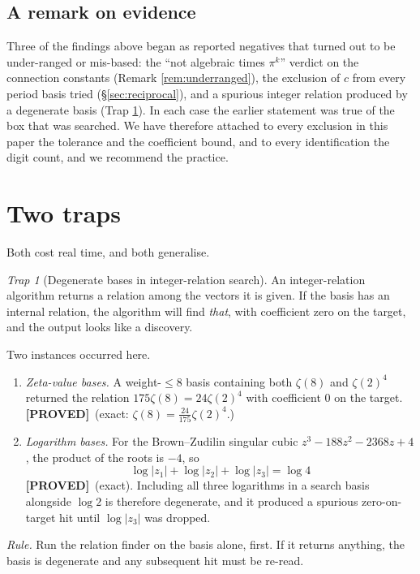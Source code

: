 \documentclass[11pt,reqno]{amsart}
\theoremstyle{plain}
\theoremstyle{definition}
\theoremstyle{remark}
\newtheorem{trap}[theorem]{Trap}
\newcommand{\PROVED}{{\normalfont\sffamily\bfseries[PROVED]}}
\begin{document}
\subsection{A remark on evidence}
Three of the findings above began as reported negatives that turned out to be under-ranged or
mis-based: the ``not algebraic times $\pi^k$'' verdict on the connection constants (Remark
\ref{rem:underranged}), the exclusion of $c$ from every period basis tried (\S\ref{sec:reciprocal}),
and a spurious integer relation produced by a degenerate basis (Trap \ref{trap:basis}). In each
case the earlier statement was true of the box that was searched. We have therefore attached to
every exclusion in this paper the tolerance and the coefficient bound, and to every identification
the digit count, and we recommend the practice.

\appendix

\section{Two traps}\label{app:traps}

Both cost real time, and both generalise.

\begin{trap}[Degenerate bases in integer-relation search]\label{trap:basis}
An integer-relation algorithm returns a relation among the vectors it is given. If the basis has
an internal relation, the algorithm will find \emph{that}, with coefficient zero on the target,
and the output looks like a discovery.

Two instances occurred here.
\begin{enumerate}[label=(\alph*),leftmargin=2.2em]
\item \emph{Zeta-value bases.} A weight-$\le8$ basis containing both $\zeta(8)$ and $\zeta(2)^4$
returned the relation $175\zeta(8)=24\zeta(2)^4$ with coefficient $0$ on the target. \PROVED\
(exact: $\zeta(8)=\tfrac{24}{175}\zeta(2)^4$.)
\item \emph{Logarithm bases.} For the Brown--Zudilin singular cubic
$z^3-188z^2-2368z+4$, the product of the roots is $-4$, so
\[
  \log|z_1|+\log|z_2|+\log|z_3|=\log 4
\]
\PROVED\ (exact). Including all three logarithms in a search basis alongside $\log 2$ is therefore
degenerate, and it produced a spurious zero-on-target hit until $\log|z_3|$ was dropped.
\end{enumerate}

\emph{Rule.} Run the relation finder on the basis alone, first. If it returns anything, the basis
is degenerate and any subsequent hit must be re-read.
\end{trap}
\end{document}
